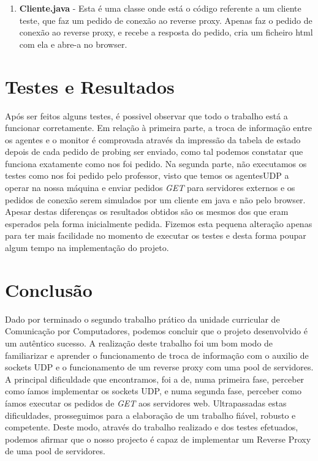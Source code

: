 \documentclass{llncs}
\begin{document}
\begin{enumerate}
				\bigskip
				\item \textbf{Cliente.java} - Esta é uma classe onde está o código referente a um cliente teste, que faz um pedido de conexão ao reverse proxy. Apenas faz o pedido de conexão ao reverse proxy, e recebe a resposta do pedido, cria um ficheiro html com ela e abre-a no browser.
			
			\end{enumerate}

\section{Testes e Resultados}

	Após ser feitos alguns testes, é possivel observar que todo o trabalho está a funcionar corretamente. Em relação à primeira parte, a troca de informação entre os agentes e o monitor é comprovada através da impressão da tabela de estado depois de cada pedido de probing ser enviado, como tal podemos constatar que funciona exatamente como nos foi pedido. Na segunda parte, não executamos os testes como nos foi pedido pelo professor, visto que temos os agentesUDP a operar na nossa máquina e enviar pedidos \textit{GET} para servidores externos e os pedidos de conexão serem simulados por um cliente em java e não pelo browser. Apesar destas diferenças os resultados obtidos são os mesmos dos que eram esperados pela forma inicialmente pedida. Fizemos esta pequena alteração apenas para ter mais facilidade no momento de executar os testes e desta forma poupar algum tempo na implementação do projeto.

\section{Conclusão} \label{concl}

	Dado por terminado o segundo trabalho prático da unidade curricular de Comunicação por Computadores, podemos concluir que o projeto desenvolvido é um autêntico sucesso.
	A realização deste trabalho foi um bom modo de familiarizar e aprender o funcionamento de troca de informação com o auxilio de sockets UDP e o funcionamento de um reverse proxy com uma pool de servidores.
	A principal dificuldade que encontramos, foi a de, numa primeira fase, perceber como íamos implementar os sockets UDP, e numa segunda fase, perceber como íamos executar os pedidos de \textit{GET} aos servidores web. Ultrapassadas estas dificuldades, prosseguimos para a elaboração de um trabalho fiável, robusto e competente.
	Deste modo, através do trabalho realizado e dos testes efetuados, podemos afirmar que o nosso projecto é capaz de implementar um Reverse Proxy de uma pool de servidores.
\end{document}
